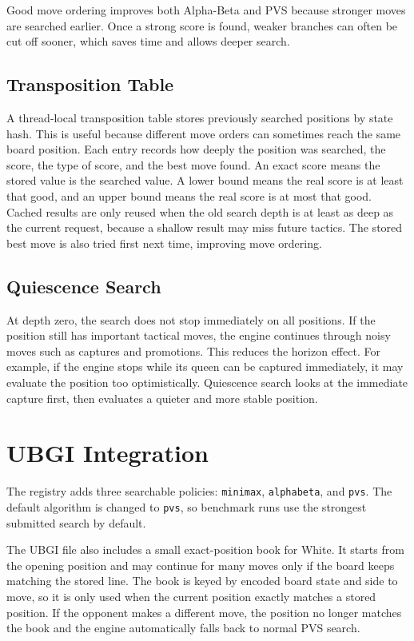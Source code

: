 \documentclass[11pt,a4paper]{article}
\begin{document}
Good move ordering improves both Alpha-Beta and PVS because stronger moves are
searched earlier. Once a strong score is found, weaker branches can often be
cut off sooner, which saves time and allows deeper search.

\subsection{Transposition Table}

A thread-local transposition table stores previously searched positions by
state hash. This is useful because different move orders can sometimes reach
the same board position. Each entry records how deeply the position was
searched, the score, the type of score, and the best move found. An exact score
means the stored value is the searched value. A lower bound means the real score
is at least that good, and an upper bound means the real score is at most that
good. Cached results are only reused when the old search depth is at least as
deep as the current request, because a shallow result may miss future tactics.
The stored best move is also tried first next time, improving move ordering.

\subsection{Quiescence Search}

At depth zero, the search does not stop immediately on all positions. If the
position still has important tactical moves, the engine continues through noisy
moves such as captures and promotions. This reduces the horizon effect. For
example, if the engine stops while its queen can be captured immediately, it may
evaluate the position too optimistically. Quiescence search looks at the
immediate capture first, then evaluates a quieter and more stable position.

\section{UBGI Integration}

The registry adds three searchable policies: \texttt{minimax},
\texttt{alphabeta}, and \texttt{pvs}. The default algorithm is changed to
\texttt{pvs}, so benchmark runs use the strongest submitted search by default.

The UBGI file also includes a small exact-position book for White. It starts
from the opening position and may continue for many moves only if the board
keeps matching the stored line. The book is keyed by encoded board state and
side to move, so it is only used when the current position exactly matches a
stored position. If the opponent makes a different move, the position no longer
matches the book and the engine automatically falls back to normal PVS search.
\end{document}
